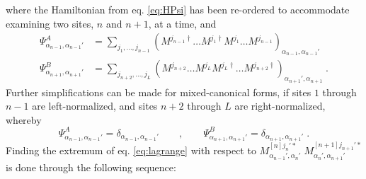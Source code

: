 where the Hamiltonian from eq. \eqref{eq:HPsi} has been re-ordered to accommodate examining two sites, $n$ and $n+1$, at a time, and 
\begin{align}
\Psi_{\alpha_{n-1},\alpha_{n-1}'}^{A} &= \sum_{j_1 , \ldots , j_{n-1}} \left( M^{j_{n-1} \dag} \ldots M^{j_{1} \dag} M^{j_1} \ldots M^{j_{n-1}} \right) _{\alpha_{n-1} , \alpha_{n-1} '} \label{eq:psiA} \\
\Psi_{\alpha_{n+1},\alpha_{n+1}'}^{B} &= \sum_{j_{n+2} , \ldots , j_{L}} \left( M^{j_{n+2} } \ldots M^{j_{L} } M^{j_L \dag} \ldots M^{j_{n+2} \dag} \right) _{\alpha_{n+1} ', \alpha_{n+1} } \; .
\end{align}
Further simplifications can be made for mixed-canonical forms, if sites $1$ through $n-1$ are left-normalized, and sites $n+2$ through $L$ are right-normalized, whereby
\begin{equation}
	\Psi_{\alpha_{n-1},\alpha_{n-1}'}^{A} = \delta_{\alpha_{n-1},\alpha_{n-1}'} \qquad , \qquad \Psi_{\alpha_{n+1},\alpha_{n+1}'}^{B} = \delta_{\alpha_{n+1},\alpha_{n+1}'} \; .
\end{equation}
Finding the extremum of eq. \eqref{eq:lagrange} with respect to $M_{\alpha_{n-1} ' , \alpha_{n} '}^{[n] j_n ' *} \; M_{\alpha_{n} ' , \alpha_{n+1} '}^{[n+1] j_{n+1} ' *}$ is done through the following sequence:

